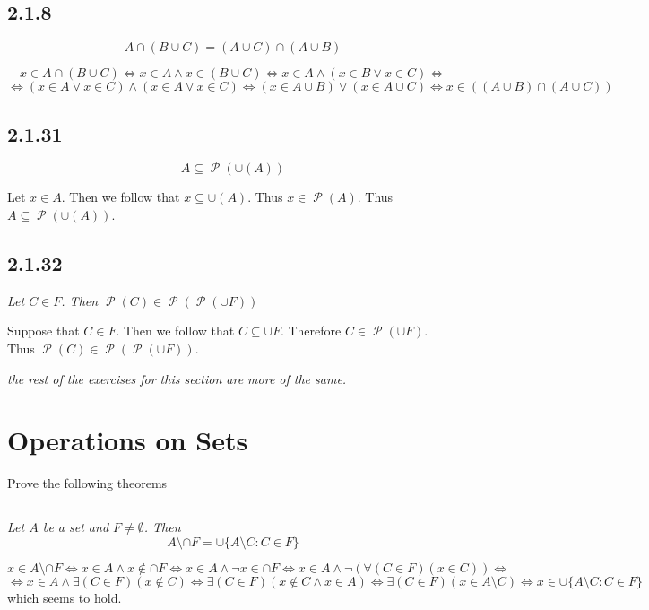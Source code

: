 \documentclass[11pt,oneside,titlepage]{book}
\DeclareMathOperator \pow {\mathcal {P}}
\DeclareMathOperator \lra {\Leftrightarrow}
\begin{document}
\subsection*{2.1.8}

$$A \cap (B \cup C) = (A \cup C) \cap (A \cup B)$$

$$x \in A \cap (B \cup C) \lra  x \in A \land x \in (B \cup C) \lra
x \in A \land (x \in B \lor x \in C) \lra
$$
$$ \lra (x \in A \lor x \in C) \land (x \in A \lor x \in C)
\lra (x \in A \cup B) \lor (x \in A \cup C) \lra x \in ((A \cup B) \cap (A \cup C))$$

\subsection*{2.1.31}

$$A \subseteq \pow(\cup(A))$$

Let $x \in A$. Then we follow that $x \subseteq \cup(A)$. Thus $x \in \pow(A)$. Thus
$A \subseteq \pow(\cup(A))$.

\subsection*{2.1.32}

\textit{Let $C \in F$. Then $\pow(C) \in \pow(\pow(\cup F))$}

Suppose that $C \in F$. Then we follow that $C \subseteq \cup F$. Therefore $C \in \pow (\cup F)$.
Thus $\pow(C) \in \pow(\pow (\cup F))$.


\textit{the rest of the exercises for this section are more of the same.}

\section{Operations on Sets}

Prove the following theorems

\subsection{}

\textit{Let $A$ be a set and $F \neq \emptyset$. Then}
$$A \setminus \cap F = \cup\{A \setminus C: C \in F\}$$

$$x \in A \setminus \cap F \lra
x \in A \land x \notin \cap F \lra
x \in A \land \neg x \in \cap F \lra
x \in A \land \neg (\forall(C \in F)(x \in C)) \lra
$$
$$ \lra
x \in A \land \exists(C \in F)(x \notin C) \lra
\exists(C \in F)(x \notin C \land x \in A) \lra
\exists(C \in F)(x \in A \setminus C) \lra
x \in \cup\{A \setminus C: C \in F\}
$$
which seems to hold.
\end{document}
